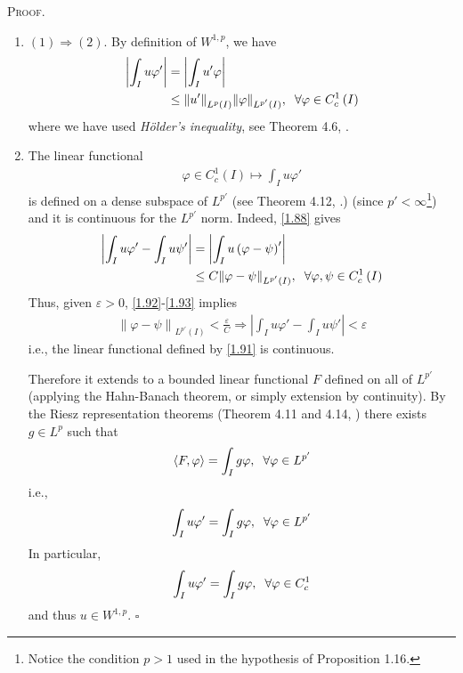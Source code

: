 \documentclass[a4paper,oneside]{article}
\numberwithin{equation}{section}
\begin{document}
\textsc{Proof.} 
\begin{enumerate}
\item $\left( 1 \right) \Rightarrow \left( 2 \right)$.  By definition of $W^{1,p}$, we have
\begin{align}
\left| {\int_I {u\varphi '} } \right|& = \left| {\int_I {u'\varphi } } \right|\\
& \le {\left\| {u'} \right\|_{{L^p}\left( I \right)}}{\left\| \varphi  \right\|_{{L^{p'}}\left( I \right)}},\hspace{0.2cm}\forall \varphi  \in C_c^1\left( I \right)
\end{align}
where we have used \textit{H\"{o}lder's inequality}, see Theorem 4.6, \cite{1}.
\item The linear functional
\begin{align}
\label{1.91}
\varphi  \in C_c^1\left( I \right) \mapsto \int_I {u\varphi '} 
\end{align}
is defined on a dense subspace of $L^{p'}$ (see Theorem 4.12, \cite{1}.) (since $p'<\infty$\footnote{Notice the condition $p>1$ used in the hypothesis of Proposition 1.16.}) and it is continuous for the $L^{p'}$ norm. Indeed, \eqref{1.88} gives
\begin{align}
\label{1.92}
\left| {\int_I {u\varphi '}  - \int_I {u\psi '} } \right| &= \left| {\int_I {u\left( {\varphi  - \psi } \right)'} } \right|\\
& \le C{\left\| {\varphi  - \psi } \right\|_{{L^{p'}}\left( I \right)}},\hspace{0.2cm}\forall \varphi ,\psi  \in C_c^1\left( I \right) \label{1.93}
\end{align}
Thus, given $\varepsilon >0$, \eqref{1.92}-\eqref{1.93} implies
\begin{align}
{\left\| {\varphi  - \psi } \right\|_{{L^{p'}}\left( I \right)}} < \frac{\varepsilon }{C} \Rightarrow \left| {\int_I {u\varphi '}  - \int_I {u\psi '} } \right| < \varepsilon 
\end{align}
i.e., the linear functional defined by \eqref{1.91} is continuous. 

Therefore it extends to a bounded linear functional $F$ defined on all of $L^{p'}$ (applying the Hahn-Banach theorem, or simply extension by continuity). By the Riesz representation theorems (Theorem 4.11 and 4.14, \cite{1}) there exists $g\in L^p$ such that
\begin{align}
\left\langle {F,\varphi } \right\rangle  = \int_I {g\varphi } ,\hspace{0.2cm}\forall \varphi  \in {L^{p'}}
\end{align}
i.e.,
\begin{align}
\int_I {u\varphi '}  = \int_I {g\varphi } ,\hspace{0.2cm} \forall \varphi  \in {L^{p'}}
\end{align}
In particular,
\begin{align}
\int_I {u\varphi '}  = \int_I {g\varphi } ,\hspace{0.2cm} \forall \varphi  \in C_c^1
\end{align}
and thus $u\in W^{1,p}$. \hfill $\square$
\end{enumerate}
\end{document}
